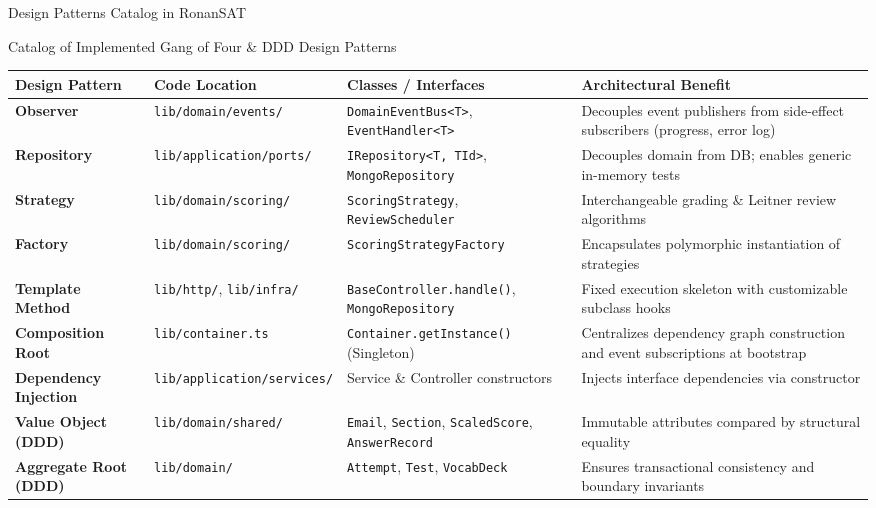 ﻿\documentclass[aspectratio=169,10pt,t]{beamer}
\begin{document}
\begin{frame}{Design Patterns Catalog in RonanSAT}
  \vspace{0.2mm}
  \begin{infoCard}{Catalog of Implemented Gang of Four \& DDD Design Patterns}
    \fontsize{5.0pt}{6.0pt}\selectfont
    \renewcommand{\arraystretch}{0.93}
    \begin{tabular}{@{}p{18mm}p{22mm}p{30mm}p{48mm}@{}}
      \toprule
      \textbf{Design Pattern} & \textbf{Code Location} & \textbf{Classes / Interfaces} & \textbf{Architectural Benefit} \\
      \midrule
      \textbf{Observer} & \texttt{lib/domain/events/} & \texttt{DomainEventBus<T>}, \texttt{EventHandler<T>} & Decouples event publishers from side-effect subscribers (progress, error log) \\
      \textbf{Repository} & \texttt{lib/application/ports/} & \texttt{IRepository<T, TId>}, \texttt{MongoRepository} & Decouples domain from DB; enables generic in-memory tests \\
      \textbf{Strategy} & \texttt{lib/domain/scoring/} & \texttt{ScoringStrategy}, \texttt{ReviewScheduler} & Interchangeable grading \& Leitner review algorithms \\
      \textbf{Factory} & \texttt{lib/domain/scoring/} & \texttt{ScoringStrategyFactory} & Encapsulates polymorphic instantiation of strategies \\
      \textbf{Template Method} & \texttt{lib/http/}, \texttt{lib/infra/} & \texttt{BaseController.handle()}, \texttt{MongoRepository} & Fixed execution skeleton with customizable subclass hooks \\
      \textbf{Composition Root} & \texttt{lib/container.ts} & \texttt{Container.getInstance()} (Singleton) & Centralizes dependency graph construction and event subscriptions at bootstrap \\
      \textbf{Dependency Injection} & \texttt{lib/application/services/} & Service \& Controller constructors & Injects interface dependencies via constructor \\
      \textbf{Value Object (DDD)} & \texttt{lib/domain/shared/} & \texttt{Email}, \texttt{Section}, \texttt{ScaledScore}, \texttt{AnswerRecord} & Immutable attributes compared by structural equality \\
      \textbf{Aggregate Root (DDD)} & \texttt{lib/domain/} & \texttt{Attempt}, \texttt{Test}, \texttt{VocabDeck} & Ensures transactional consistency and boundary invariants \\
      \bottomrule
    \end{tabular}
  \end{infoCard}


\end{frame}
\end{document}
